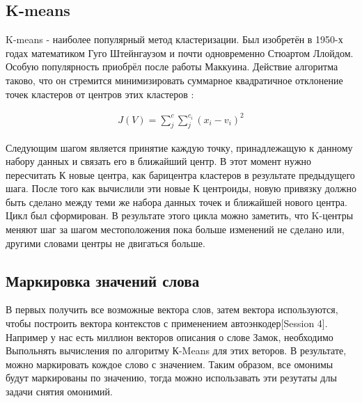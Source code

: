 \documentclass[12pt]{article}
\begin{document}
\subsection{K-means}

K-means - наиболее популярный метод кластеризации. Был изобретён в 1950-х годах математиком Гуго Штейнгаузом и почти одновременно Стюартом Ллойдом. Особую популярность приобрёл после работы Маккуина. Действие алгоритма таково, что он стремится минимизировать суммарное квадратичное отклонение точек кластеров от центров этих кластеров \cite{kmeans}:

	\begin{align}
		J(V) = \sum_{j}^{c}\sum_{j}^{c_i}(x_i-v_i)^2
	\end{align}

Следующим шагом является принятие каждую точку, принадлежащую к данному набору данных и связать его в ближайший центр. В этот момент нужно пересчитать К новые центра, как барицентра кластеров в результате предыдущего шага. После того как вычислили эти новые К центроиды, новую привязку должно быть сделано между теми же набора данных точек и ближайшей нового центра. Цикл был сформирован. В результате этого цикла можно заметить, что K-центры меняют шаг за шагом местоположения пока больше изменений не сделано или, другими словами центры не двигаться больше.

\subsection{Маркировка значений слова}

В первых получить все возможные вектора слов, затем вектора используются, чтобы построить вектора контекстов с применением автоэнкодер[Session 4]. Например у нас есть миллион векторов описания о слове Замок, необходимо Выпольнять вычисления по алгоритму К-Means для этих веторов. В результате, можно маркировать кождое слово с  значением. Таким образом, все омонимы будут маркированы по значению, тогда можно использавать эти резутаты длы задачи снятия омонимий. 
\end{document}
